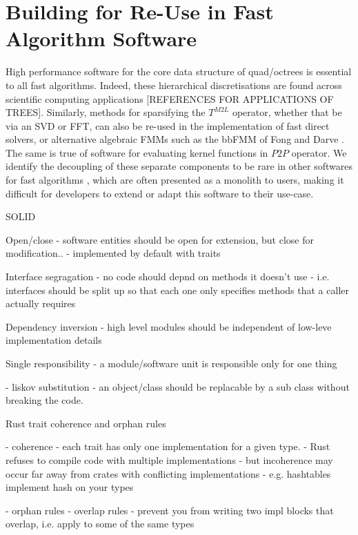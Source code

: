\section{Building for Re-Use in Fast Algorithm Software}\label{chpt:2:sec:3}

High performance software for the core data structure of quad/octrees is essential to all fast algorithms. Indeed, these hierarchical discretisations are found across scientific computing applications [REFERENCES FOR APPLICATIONS OF TREES]. Similarly, methods for sparsifying the $T^{M2L}$ operator, whether that be via an SVD or FFT, can also be re-used in the implementation of fast direct solvers, or alternative algebraic FMMs such as the bbFMM of Fong and Darve \cite{fong2009black}. The same is true of software for evaluating kernel functions in $P2P$ operator. We identify the decoupling of these separate components to be rare in other softwares for fast algorithms \cite{malhotra2015pvfmm,wang2021exafmm,h2lib2016github}, which are often presented as a monolith to users, making it difficult for developers to extend or adapt this software to their use-case.


SOLID

Open/close
- software entities should be open for extension, but close for modification..
    - implemented by default with traits

Interface segragation
    - no code should depnd on methods it doesn't use
    - i.e. interfaces should be split up so that each one only specifies methods
        that a caller actually requires

Dependency inversion
    - high level modules should be independent of low-leve implementation details

Single responsibility
    - a module/software unit is responsible only for one thing

- liskov substitution
    - an object/class should be replacable by a sub class without breaking the code.

Rust trait coherence and orphan rules

- coherence - each trait has only one implementation for a given type.
    - Rust refuses to compile code with multiple implementations
    - but incoherence may occur far away from crates with conflicting implementations
        - e.g. hashtables implement hash on your types

- orphan rules
    - overlap rules
        - prevent you from writing two impl blocks that overlap, i.e. apply to some of the same types

